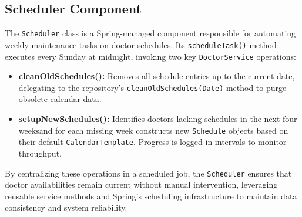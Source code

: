 \subsection{Scheduler Component}
The \texttt{Scheduler} class is a Spring-managed component responsible for automating weekly maintenance tasks on doctor schedules. Its \texttt{scheduleTask()} method executes every Sunday at midnight, invoking two key \texttt{DoctorService} operations:
\begin{itemize}
	\item \textbf{cleanOldSchedules():} Removes all schedule entries up to the current date, delegating to the repository’s \texttt{cleanOldSchedules(Date)} method to purge obsolete calendar data.
	\item \textbf{setupNewSchedules():} Identifies doctors lacking schedules in the next four weeksand for each missing week constructs new \texttt{Schedule} objects based on their default \texttt{CalendarTemplate}. Progress is logged in intervals to monitor throughput.
\end{itemize}

By centralizing these operations in a scheduled job, the \texttt{Scheduler} ensures that doctor availabilities remain current without manual intervention, leveraging reusable service methods and Spring’s scheduling infrastructure to maintain data consistency and system reliability.

